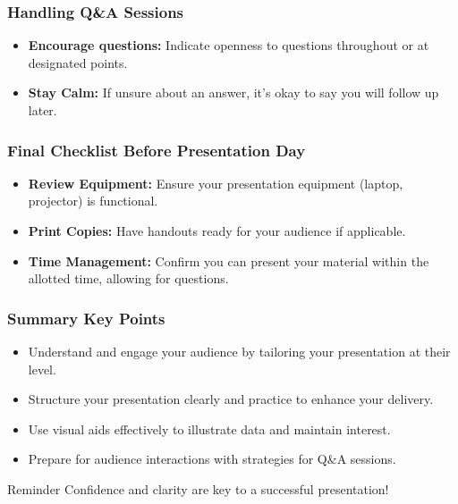 \documentclass[aspectratio=169]{beamer}
\begin{document}
\begin{frame}[fragile]
    \frametitle{Handling Q\&A Sessions}
    \begin{itemize}
        \item \textbf{Encourage questions:} Indicate openness to questions throughout or at designated points.
        \item \textbf{Stay Calm:} If unsure about an answer, it's okay to say you will follow up later.
    \end{itemize}
\end{frame}

\begin{frame}[fragile]
    \frametitle{Final Checklist Before Presentation Day}
    \begin{itemize}
        \item \textbf{Review Equipment:} Ensure your presentation equipment (laptop, projector) is functional.
        \item \textbf{Print Copies:} Have handouts ready for your audience if applicable.
        \item \textbf{Time Management:} Confirm you can present your material within the allotted time, allowing for questions.
    \end{itemize}
\end{frame}

\begin{frame}[fragile]
    \frametitle{Summary Key Points}
    \begin{itemize}
        \item Understand and engage your audience by tailoring your presentation at their level.
        \item Structure your presentation clearly and practice to enhance your delivery.
        \item Use visual aids effectively to illustrate data and maintain interest.
        \item Prepare for audience interactions with strategies for Q\&A sessions.
    \end{itemize}
    \begin{block}{Reminder}
        Confidence and clarity are key to a successful presentation!
    \end{block}
\end{frame}
\end{document}
